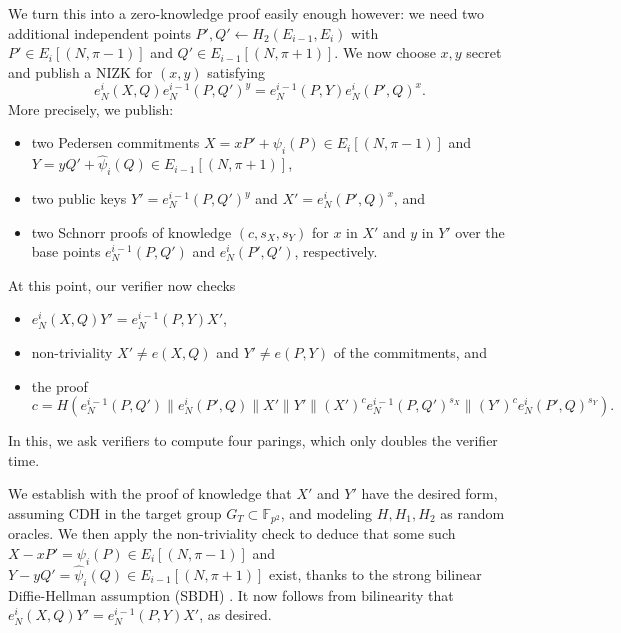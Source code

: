 \documentclass{llncs}
\newcommand{\F}{\mathbb{F}}
\begin{document}
We turn this into a zero-knowledge proof easily enough however: 
we need two additional independent points
$P',Q' \gets H_2(E_{i-1},E_i)$ with
 $P' \in E_i[(N,\pi-1)]$ and $Q' \in E_{i-1}[(N,\pi+1)]$.
We now choose $x,y$ secret and publish a NIZK for $(x,y)$ satisfying
$$ e_N^i(X,Q) e_N^{i-1}(P,Q')^y  = e_N^{i-1}(P,Y) e_N^i(P',Q)^x . $$
More precisely, we publish:
\begin{itemize}
\item two Pedersen commitments 
 $X = x P' + \psi_i(P) \in E_i[(N,\pi-1)]$ and
 $Y = y Q' + \hat\psi_i(Q) \in E_{i-1}[(N,\pi+1)]$,
\item two public keys $Y' = e_N^{i-1}(P,Q')^y$ and $X' = e_N^i(P',Q)^x$, and
\item two Schnorr proofs of knowledge $(c,s_X,s_Y)$ for $x$ in $X'$ and $y$ in $Y'$
over the base points $e_N^{i-1}(P,Q')$ and $e_N^i(P',Q')$, respectively.
\end{itemize}
At this point, our verifier now checks 
\begin{itemize}
\item $e_N^i(X,Q) Y' = e_N^{i-1}(P,Y) X'$,
\item non-triviality $X' \ne e(X,Q)$ and $Y' \ne e(P,Y)$ of the commitments, and
\item the proof
$$ c = H( 
  e_N^{i-1}(P,Q') \| e_N^i(P',Q) \| 
  X' \| Y' \| 
  (X')^c e_N^{i-1}(P,Q')^{s_X} \| 
  (Y')^c e_N^i(P',Q)^{s_Y} 
). $$
\end{itemize}
In this, we ask verifiers to compute four parings, which only doubles
the verifier time.

We establish with the proof of knowledge that $X'$ and $Y'$ have
the desired form, assuming CDH in the target group $G_T\subset\F_{p^2}$,
and modeling $H,H_1,H_2$ as random oracles.
We then apply the non-triviality check to deduce that some such 
 $X - x P' = \psi_i(P) \in E_i[(N,\pi-1)]$ and
 $Y - y Q' = \hat\psi_i(Q) \in E_{i-1}[(N,\pi+1)]$
exist, thanks to the strong bilinear Diffie-Hellman assumption (SBDH) 
\cite{10.1007/978-3-540-74143-5_24}. 
It now follows from bilinearity that $e_N^i(X,Q)Y' = e_N^{i-1}(P,Y)X'$, as desired.
\end{document}
